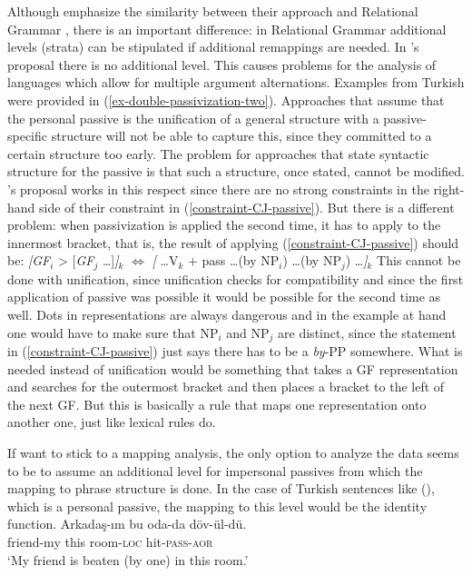 \begin{exe}
\begin{xlist}[iv.]
\begin{exe}
\begin{xlist}[iv.]
\largerpage
Although \citeauthor{CJ2005a} emphasize the similarity between their approach and Relational
Grammar \citep{Perlmutter83a-ed}, there is an important difference: in Relational Grammar additional levels (strata) can be stipulated
if additional remappings are needed. In \citeauthor{CJ2005a}'s proposal there is no additional
level. This causes problems for the analysis of languages which allow for multiple argument alternations. Examples from Turkish were provided in
(\ref{ex-double-passivization-two}). Approaches that assume that the personal passive is the unification
of a general structure with a passive-specific structure will not be able to capture this, since they committed
to a certain structure too early. The problem for approaches that state syntactic structure for the
passive is that such a structure, once stated, cannot be modified. \citeauthor{CJ2005a}'s 
 proposal works in this respect since there are no strong constraints in the
right-hand side of their constraint in (\ref{constraint-CJ-passive}). But there is a different
problem: when passivization is applied the second time, it has to apply to the innermost bracket,
that is, the result of applying (\ref{constraint-CJ-passive}) should be:
\ea
{}\emph{[GF}$_i$ > [\emph{GF}$_j$ \ldots]\emph{]}$_k$ $\Leftrightarrow$ \emph{[} \ldots V$_k$ $+$ pass \ldots (by NP$_i$) \ldots (by NP$_j$) \ldots\emph{]}$_k$
\z
This cannot be done with unification, since unification checks for compatibility and since the first
application of passive was possible it would be possible for the second time as well. Dots in
representations are always dangerous and in the example at hand one would have to make sure that
NP$_i$ and NP$_j$ are distinct, since the statement in (\ref{constraint-CJ-passive}) just says there
has to be a \emph{by}-PP somewhere. What is needed instead of unification would be something that takes a GF representation
and searches for the outermost bracket and then places a bracket to the left of the next GF. But
this is basically a rule that maps one representation onto another one, just like lexical rules do.

If \citeauthor{CJ2005a} want to stick to a mapping analysis, the only option to analyze the data
seems to be to assume an additional level for impersonal passives from which the mapping to phrase
structure is done. In the case of Turkish sentences like (), which is a personal passive, the mapping
to this level would be the identity function.   
\ea
\gll Arkadaş-ım bu oda-da döv-ül-dü.\\
     friend-my  this   room-\textsc{loc} hit-\textsc{pass}-\textsc{aor}\\
\glt `My friend is beaten (by one) in this room.'
\z


\end{xlist}
\end{exe}
\end{xlist}
\end{exe}
